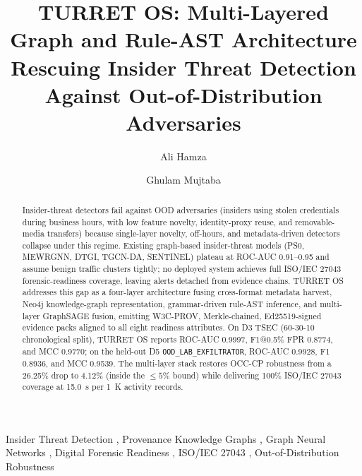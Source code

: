 \documentclass[a4paper,fleqn]{cas-dc}
\begin{document}
\let\WriteBookmarks\relax

\shorttitle{}
\shortauthors{}

\title[mode=title]{TURRET OS: Multi-Layered Graph and Rule-AST Architecture Rescuing Insider Threat Detection Against Out-of-Distribution Adversaries}

\author[1]{Ali Hamza}
\cormark[1]

\author[2]{Ghulam Mujtaba}

\address[1]{National University of Sciences and Technology (NUST), Islamabad, Pakistan}
\address[2]{National University of Computer and Emerging Sciences (FAST-NUCES), Islamabad, Pakistan}


\begin{abstract}
Insider-threat detectors fail against OOD adversaries (insiders using stolen credentials during business hours, with low feature novelty, identity-proxy reuse, and removable-media transfers) because single-layer novelty, off-hours, and metadata-driven detectors collapse under this regime. Existing graph-based insider-threat models (PS0, MEWRGNN, DTGI, TGCN-DA, SENTINEL) plateau at ROC-AUC 0.91--0.95 and assume benign traffic clusters tightly; no deployed system achieves full ISO/IEC 27043 forensic-readiness coverage, leaving alerts detached from evidence chains. TURRET OS addresses this gap as a four-layer architecture fusing cross-format metadata harvest, Neo4j knowledge-graph representation, grammar-driven rule-AST inference, and multi-layer GraphSAGE fusion, emitting W3C-PROV, Merkle-chained, Ed25519-signed evidence packs aligned to all eight readiness attributes. On D3 TSEC (60-30-10 chronological split), TURRET OS reports ROC-AUC 0.9997, F1@0.5\% FPR 0.8774, and MCC 0.9770; on the held-out D5 \texttt{OOD\_\allowbreak LAB\_\allowbreak EXFILTRATOR}, ROC-AUC 0.9928, F1 0.8936, and MCC 0.9539. The multi-layer stack restores OCC-CP robustness from a 26.25\% drop to 4.12\% (inside the $\le 5\%$ bound) while delivering 100\% ISO/IEC 27043 coverage at 15.0~s per 1~K activity records.
\end{abstract}

\begin{keywords}
Insider Threat Detection \sep
Provenance Knowledge Graphs \sep
Graph Neural Networks \sep
Digital Forensic Readiness \sep
ISO/IEC 27043 \sep
Out-of-Distribution Robustness
\end{keywords}
\end{document}
